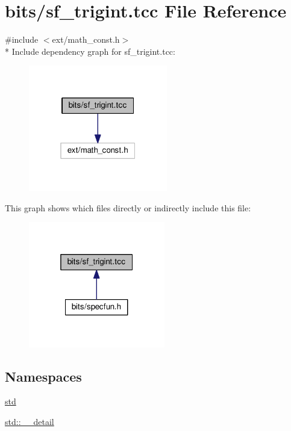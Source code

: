 \hypertarget{sf__trigint_8tcc}{}\section{bits/sf\+\_\+trigint.tcc File Reference}
\label{sf__trigint_8tcc}
{\ttfamily \#include $<$ext/math\+\_\+const.\+h$>$}\\*
Include dependency graph for sf\+\_\+trigint.\+tcc\+:
\nopagebreak
\begin{figure}[H]
\begin{center}
\leavevmode
\includegraphics[width=172pt]{sf__trigint_8tcc__incl}
\end{center}
\end{figure}
This graph shows which files directly or indirectly include this file\+:
\nopagebreak
\begin{figure}[H]
\begin{center}
\leavevmode
\includegraphics[width=169pt]{sf__trigint_8tcc__dep__incl}
\end{center}
\end{figure}
\subsection*{Namespaces}
\begin{DoxyCompactItemize}
\item 
 \hyperlink{namespacestd}{std}
\item 
 \hyperlink{namespacestd_1_1____detail}{std\+::\+\_\+\+\_\+detail}
\end{DoxyCompactItemize}
